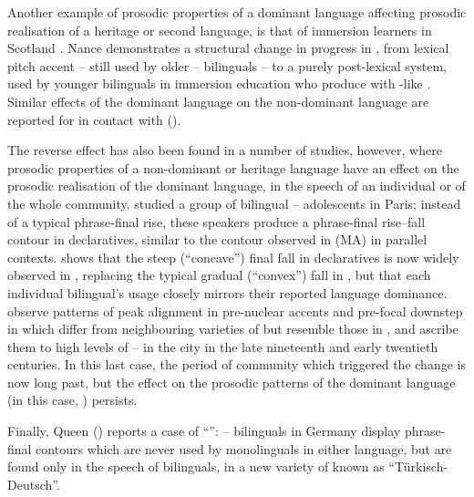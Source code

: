 \documentclass[output=paper]{langsci/langscibook}
\begin{document}
Another example of prosodic properties of a dominant language affecting prosodic realisation of a heritage or second language, is that of immersion  learners in Scotland \citep{Nance2015}. Nance demonstrates a structural change in progress in , from lexical pitch accent – still used by older -- bilinguals – to a purely post-lexical system, used by younger bilinguals in immersion education who produce  with -like .  Similar effects of the dominant language on the non-dominant language are reported for  in contact with  (\citealt{ORourke2004}).  

The reverse effect has also been found in a number of studies, however, where prosodic properties of a non-dominant or heritage language have an effect on the prosodic realisation of the dominant language, in the speech of an individual or of the whole community. \citet{Fagyal2005} studied a group of bilingual -- adolescents in Paris; instead of a typical  phrase-final rise, these speakers produce a phrase-final rise--fall contour in declaratives, similar to the contour observed in   (MA) in parallel contexts. \citet{Simonet2011} shows that the steep (``concave'') final fall in   declaratives is now widely observed in  , replacing the typical gradual (``convex'') fall in  , but that each individual bilingual’s usage closely mirrors their reported language dominance. \citet{ColantoniGurlekian2004} observe patterns of peak alignment in pre-nuclear accents and pre-focal downstep in   which differ from neighbouring varieties of  but resemble those in , and ascribe them to high levels of --  in the city in the late nineteenth and early twentieth centuries. In this last case, the period of community  which triggered the change is now long past, but the effect on the prosodic patterns of the dominant language (in this case, ) persists.

Finally, Queen (\citeyear{Queen2001,Queen2012}) reports a case of ``'': -- bilinguals in Germany display phrase-final  contours which are never used by monolinguals in either language, but are found only in the speech of bilinguals, in a new variety of  known as ``Türkisch-Deutsch''.
\end{document}
